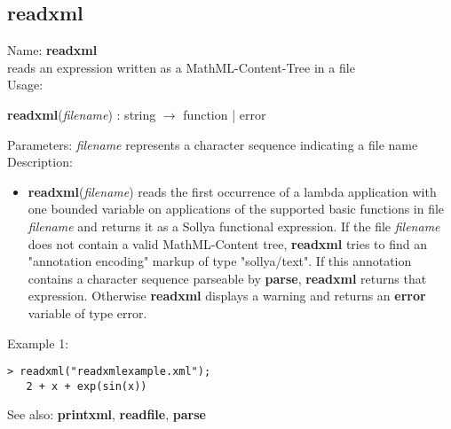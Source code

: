 \subsection{ readxml }
\noindent Name: \textbf{readxml}\\
reads an expression written as a MathML-Content-Tree in a file\\

\noindent Usage: 
\begin{center}
\textbf{readxml}(\emph{filename}) : \textsf{string} $\rightarrow$ \textsf{function} | \textsf{error}\\
\end{center}
Parameters: 
\emph{filename} represents a character sequence indicating a file name\\

\noindent Description: \begin{itemize}

\item \textbf{readxml}(\emph{filename}) reads the first occurrence of a lambda
   application with one bounded variable on applications of the supported
   basic functions in file \emph{filename} and returns it as a Sollya
   functional expression.
   If the file \emph{filename} does not contain a valid MathML-Content tree,
   \textbf{readxml} tries to find an "annotation encoding" markup of type
   "sollya/text". If this annotation contains a character sequence
   parseable by \textbf{parse}, \textbf{readxml} returns that expression.  Otherwise
   \textbf{readxml} displays a warning and returns an \textbf{error} variable of type
   \textsf{error}.
\end{itemize}
\noindent Example 1: 
\begin{center}\begin{minipage}{14.8cm}\begin{Verbatim}[frame=single]
   > readxml("readxmlexample.xml");
   2 + x + exp(sin(x))
\end{Verbatim}
\end{minipage}\end{center}
See also: \textbf{printxml}, \textbf{readfile}, \textbf{parse}
